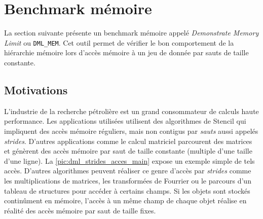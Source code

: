 \section{Benchmark mémoire}\label{sec:dmlmem}

    La section suivante présente un benchmark mémoire appelé \textit{Demonstrate Memory Limit} ou \verb=DML_MEM=. Cet outil permet de vérifier le bon comportement de la hiérarchie mémoire lors d'accès mémoire à un jeu de donnée par sauts de taille constante. 

    

    \subsection{Motivations}
    
        L'industrie de la recherche pétrolière est un grand consommateur de calculs haute performance. Les applications utilisées utilisent des algorithmes de Stencil qui impliquent des accès mémoire réguliers, mais non contigus par \textit{sauts} aussi appelés \textit{strides}. D'autres applications comme le calcul matriciel parcourent des matrices et génèrent des accès mémoire par saut de taille constante (multiple d'une taille d'une ligne). La \autoref{pic:dml_strides_acces_main} expose un exemple simple de tels accès. D'autres algorithmes peuvent réaliser ce genre d'accès par \textit{strides} comme les multiplications de matrices, les transformées de Fourrier ou le parcours d'un tableau de structures pour accéder à certains champs. Si les objets sont stockés continûment en mémoire, l'accès à un même champ de chaque objet réalise en réalité des accès mémoire par saut de taille fixes. 
        
